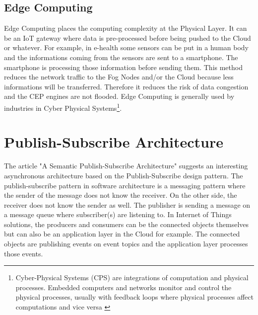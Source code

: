 \documentclass[11pt]{article}
\begin{document}

\subsection{Edge Computing}

Edge Computing places the computing complexity at the Physical Layer. It can be an IoT gateway where data is pre-processed before being pushed to the Cloud or whatever. For example, in e-health some sensors can be put in a human body and the informations coming from the sensors are sent to a smartphone. The smartphone is processing those information before sending them. This method reduces the network traffic to the Fog Nodes and/or the Cloud because less informations will be transferred. Therefore it reduces the risk of data congestion and the CEP engines are not flooded. Edge Computing is generally used by industries in Cyber Physical Systems\footnote{Cyber-Physical Systems (CPS) are integrations of computation and physical processes. Embedded computers and networks monitor and control the physical processes, usually with feedback loops where physical processes affect computations and vice versa \cite{5}}.


\section{Publish-Subscribe Architecture} \label{pub-sub}

The article "A Semantic Publish-Subscribe Architecture" \cite{A-Semantic-Publish-Subscribe-Architecture} suggests an interesting asynchronous architecture based on the Publish-Subscribe design pattern. The publish-subscribe pattern in software architecture is a messaging pattern where the sender of the message does not know the receiver. On the other side, the receiver does not know the sender as well. The publisher is sending a message on a message queue where subscriber(s) are listening to. In Internet of Things solutions, the producers and consumers can be the connected objects themselves but can also be an application layer in the Cloud for example. The connected objects are publishing events on event topics and the application layer processes those events.
\end{document}
